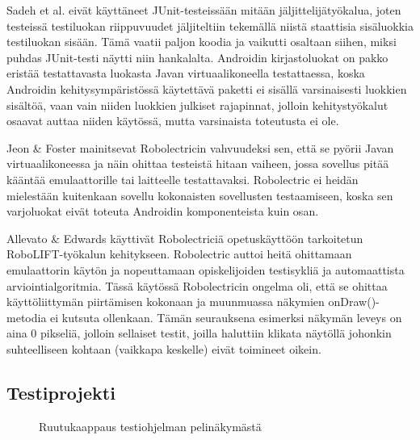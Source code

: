 Sadeh et al. eivät käyttäneet JUnit-testeissään mitään jäljittelijätyökalua, joten testeissä testiluokan riippuvuudet jäljiteltiin tekemällä niistä staattisia sisäluokkia testiluokan sisään. Tämä vaatii paljon koodia ja vaikutti osaltaan siihen, miksi puhdas JUnit-testi näytti niin hankalalta. Androidin kirjastoluokat on pakko eristää testattavasta luokasta Javan virtuaalikoneella testattaessa, koska Androidin kehitysympäristössä käytettävä paketti ei sisällä varsinaisesti luokkien sisältöä, vaan vain niiden luokkien julkiset rajapinnat, jolloin kehitystyökalut osaavat auttaa niiden käytössä, mutta varsinaista toteutusta ei ole.

Jeon \& Foster \cite{troyd} mainitsevat Robolectricin vahvuudeksi sen, että se pyörii Javan virtuaalikoneessa ja näin ohittaa testeistä hitaan vaiheen, jossa sovellus pitää kääntää emulaattorille tai laitteelle testattavaksi. Robolectric ei heidän mielestään kuitenkaan sovellu kokonaisten sovellusten testaamiseen, koska sen varjoluokat eivät toteuta Androidin komponenteista kuin osan.

Allevato \& Edwards \cite{robolift} käyttivät Robolectriciä opetuskäyttöön tarkoitetun RoboLIFT-työkalun kehitykseen. Robolectric auttoi heitä ohittamaan emulaattorin käytön ja nopeuttamaan opiskelijoiden testisykliä ja automaattista arviointialgoritmia. Tässä käytössä Robolectricin ongelma oli, että se ohittaa käyttöliittymän piirtämisen kokonaan ja muunmuassa näkymien onDraw()-metodia ei kutsuta ollenkaan. Tämän seurauksena esimerksi näkymän leveys on aina 0 pikseliä, jolloin sellaiset testit, joilla haluttiin klikata näytöllä johonkin suhteelliseen kohtaan (vaikkapa keskelle) eivät toimineet oikein.

\subsection{Testiprojekti}

\begin{figure}[h]
\centering
{}
\caption{Ruutukaappaus testiohjelman pelinäkymästä} \label{peli_screenshot}
\end{figure}

